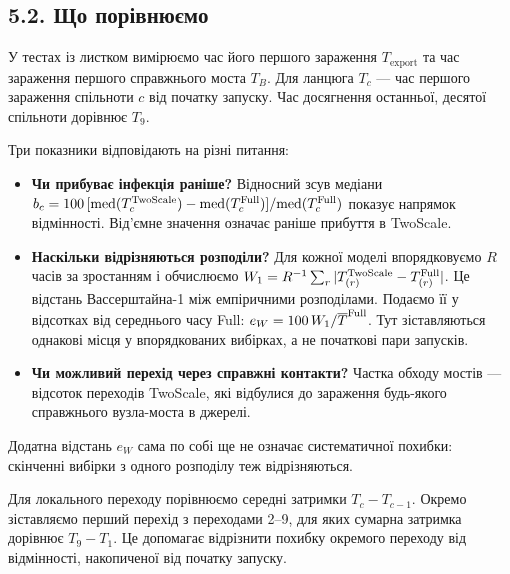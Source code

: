 \documentclass[11pt,a4paper]{article}
\newcommand{\Full}{\textnormal{Full}}
\newcommand{\TS}{\textnormal{TwoScale}}
\newcommand{\eW}{e_W}
\begin{document}
\subsection*{5.2. Що порівнюємо}
У тестах із листком вимірюємо час його першого зараження $T_{\mathrm{export}}$ та час зараження першого справжнього моста $T_B$. Для ланцюга $T_c$ --- час першого зараження спільноти $c$ від початку запуску. Час досягнення останньої, десятої спільноти дорівнює $T_9$.
\par Три показники відповідають на різні питання:
\begin{itemize}
\item \textbf{Чи прибуває інфекція раніше?} Відносний зсув медіани $b_c=100\,[\mathrm{med}(T^{\TS}_c)-\mathrm{med}(T^{\Full}_c)]/\mathrm{med}(T^{\Full}_c)$ показує напрямок відмінності. Від'ємне значення означає раніше прибуття в \TS{}.
\item \textbf{Наскільки відрізняються розподіли?} Для кожної моделі впорядковуємо $R$ часів за зростанням і обчислюємо $W_1=R^{-1}\sum_r|T^{\TS}_{(r)}-T^{\Full}_{(r)}|$. Це відстань Вассерштайна-1 між емпіричними розподілами. Подаємо її у відсотках від середнього часу \Full{}: $\eW=100\,W_1/\overline{T}^{\Full}$. Тут зіставляються однакові місця у впорядкованих вибірках, а не початкові пари запусків.
\item \textbf{Чи можливий перехід через справжні контакти?} Частка обходу мостів --- відсоток переходів \TS{}, які відбулися до зараження будь-якого справжнього вузла-моста в джерелі.
\end{itemize}
Додатна відстань $\eW$ сама по собі ще не означає систематичної похибки: скінченні вибірки з одного розподілу теж відрізняються.
\par Для локального переходу порівнюємо середні затримки $T_c-T_{c-1}$. Окремо зіставляємо перший перехід з переходами 2--9, для яких сумарна затримка дорівнює $T_9-T_1$. Це допомагає відрізнити похибку окремого переходу від відмінності, накопиченої від початку запуску.
\end{document}
